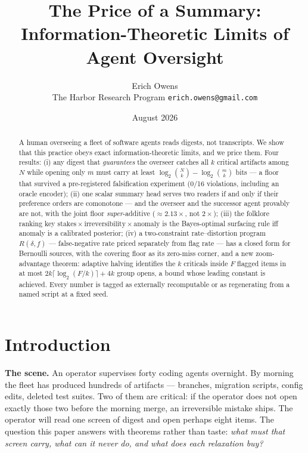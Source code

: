 \documentclass[11pt,a4paper]{article}
\title{\textbf{The Price of a Summary:}\\[4pt]
\large Information-Theoretic Limits of Agent Oversight}
\author{Erich Owens\\ \normalsize The Harbor Research Program \quad \texttt{erich.owens@gmail.com}}
\date{August 2026}
\begin{document}
\maketitle

\begin{abstract}
\noindent A human overseeing a fleet of software agents reads digests, not transcripts. We show that this practice obeys exact information-theoretic limits, and we price them. Four results: (i) any digest that \emph{guarantees} the overseer catches all $k$ critical artifacts among $N$ while opening only $m$ must carry at least $\log_2\binom{N}{k}-\log_2\binom{m}{k}$ bits --- a floor that survived a pre-registered falsification experiment (0/16 violations, including an oracle encoder); (ii) one scalar summary head serves two readers if and only if their preference orders are comonotone --- and the overseer and the successor agent provably are not, with the joint floor \emph{super}-additive ($\approx 2.13\times$, not $2\times$); (iii) the folklore ranking key $\mathrm{stakes}\times\mathrm{irreversibility}\times\mathrm{anomaly}$ is the Bayes-optimal surfacing rule iff anomaly is a calibrated posterior; (iv) a two-constraint rate--distortion program $R(\delta,f)$ --- false-negative rate priced separately from flag rate --- has a closed form for Bernoulli sources, with the covering floor as its zero-miss corner, and a new zoom-advantage theorem: adaptive halving identifies the $k$ criticals inside $F$ flagged items in at most $2k\lceil\log_2(F/k)\rceil+4k$ group opens, a bound whose leading constant is achieved. Every number is tagged as externally recomputable or as regenerating from a named script at a fixed seed.
\end{abstract}

\section{Introduction}\label{sec:intro}
\textbf{The scene.} An operator supervises forty coding agents overnight. By morning the fleet has produced hundreds of artifacts --- branches, migration scripts, config edits, deleted test suites. Two of them are critical: if the operator does not open exactly those two before the morning merge, an irreversible mistake ships. The operator will read one screen of digest and open perhaps eight items. The question this paper answers with theorems rather than taste: \emph{what must that screen carry, what can it never do, and what does each relaxation buy?}
\end{document}
